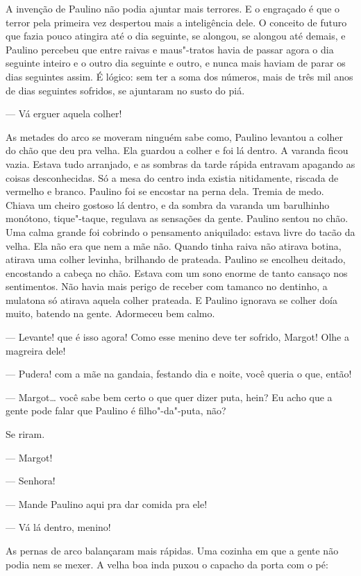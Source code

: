 \begin{linenumbers}
A invenção de Paulino não podia ajuntar mais terrores. E o engraçado é
que o terror pela primeira vez despertou mais a inteligência dele. O
conceito de futuro que fazia pouco atingira até o dia seguinte, se
alongou, se alongou até demais, e Paulino percebeu que entre raivas e
maus"-tratos havia de passar agora o dia seguinte inteiro e o outro dia
seguinte e outro, e nunca mais haviam de parar os dias seguintes assim.
É lógico: sem ter a soma dos números, mais de três mil anos de dias
seguintes sofridos, se ajuntaram no susto do piá.

--- Vá erguer aquela colher!

As metades do arco se moveram ninguém sabe como, Paulino levantou a
colher do chão que deu pra velha. Ela guardou a colher e foi lá dentro.
A varanda ficou vazia. Estava tudo arranjado, e as sombras da tarde
rápida entravam apagando as coisas desconhecidas. Só a mesa do centro
inda existia nitidamente, riscada de vermelho e branco. Paulino foi se
encostar na perna dela. Tremia de medo. Chiava um cheiro gostoso lá
dentro, e da sombra da varanda um barulhinho monótono, tique"-taque,
regulava as sensações da gente. Paulino sentou no chão. Uma calma grande
foi cobrindo o pensamento aniquilado: estava livre do tacão da velha.
Ela não era que nem a mãe não. Quando tinha raiva não atirava botina,
atirava uma colher levinha, brilhando de prateada. Paulino se encolheu
deitado, encostando a cabeça no chão. Estava com um sono enorme de tanto
cansaço nos sentimentos. Não havia mais perigo de receber com tamanco no
dentinho, a mulatona só atirava aquela colher prateada. E Paulino
ignorava se colher doía muito, batendo na gente. Adormeceu bem calmo.

--- Levante! que é isso agora! Como esse menino deve ter sofrido,
Margot! Olhe a magreira dele!

--- Pudera! com a mãe na gandaia, festando dia e noite, você queria o
que, então!

--- Margot\ldots{} você sabe bem certo o que quer dizer puta, hein? Eu acho
que a gente pode falar que Paulino é filho"-da"-puta, não?

Se riram.

--- Margot!

--- Senhora!

--- Mande Paulino aqui pra dar comida pra ele!

--- Vá lá dentro, menino!

As pernas de arco balançaram mais rápidas. Uma cozinha em que a gente
não podia nem se mexer. A velha boa inda puxou o capacho da porta com o
pé:


\end{linenumbers}
